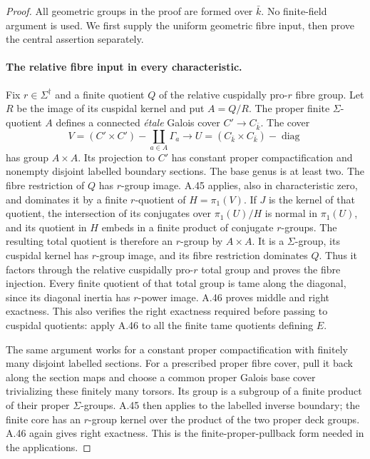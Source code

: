 \begin{proof}
All geometric groups in the proof are formed over $\bar k$.
No finite-field argument is used. We first supply the uniform
geometric fibre input, then prove the central assertion separately.

\paragraph{The relative fibre input in every characteristic.}
Fix $r\in\Sigma^\dagger$ and a finite quotient $Q$ of the
relative cuspidally pro-$r$ fibre group. Let $R$ be the image of
its cuspidal kernel and put $A=Q/R$. The proper finite
$\Sigma$-quotient $A$ defines a connected \emph{\'etale} Galois
cover $C'\to C_{\bar k}$. The cover
\[
 V=(C'\times C')-\coprod_{a\in A}\Gamma_a
       \longrightarrow U=(C_{\bar k}\times C_{\bar k})-\operatorname{diag}
\]
has group $A\times A$. Its projection to $C'$ has constant proper
compactification and nonempty disjoint labelled boundary sections.
The base genus is at least two. The fibre restriction of $Q$ has
$r$-group image. A.45 applies, also in characteristic zero, and
dominates it by a finite $r$-quotient of $H=\pi_1(V)$.
If $J$ is the kernel of that quotient, the intersection of its
conjugates over $\pi_1(U)/H$ is normal in $\pi_1(U)$, and its
quotient in $H$ embeds in a finite product of conjugate $r$-groups.
The resulting total quotient is therefore an $r$-group by
$A\times A$. It is a $\Sigma$-group, its cuspidal kernel has
$r$-group image, and its fibre restriction dominates $Q$.
Thus it factors through the relative cuspidally pro-$r$ total
group and proves the fibre injection. Every finite quotient of
that total group is tame along the diagonal, since its diagonal
inertia has $r$-power image. A.46 proves middle and right exactness.
This also verifies the right exactness required before passing to
cuspidal quotients: apply A.46 to all the finite tame quotients
defining $E$.

The same argument works for a constant proper compactification
with finitely many disjoint labelled sections. For a prescribed
proper fibre cover, pull it back along the section maps and choose
a common proper Galois base cover trivializing these finitely many
torsors. Its group is a subgroup of a finite product of their
proper $\Sigma$-groups. A.45 then applies to the labelled inverse
boundary; the finite core has an $r$-group kernel over the product
of the two proper deck groups. A.46 again gives right exactness.
This is the finite-proper-pullback form needed in the applications.


\end{proof}
